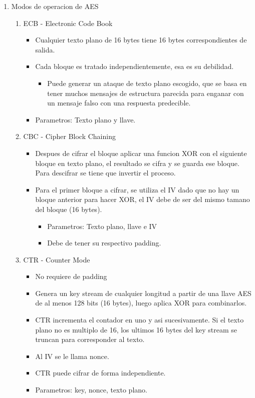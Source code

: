 \documentclass[11pt]{article}
\begin{document}
\begin{enumerate}
\item Modos de operacion de AES
\label{sec:org9fc050c}
\begin{enumerate}
\item ECB - Electronic Code Book
\label{sec:org9f8f37c}
\begin{itemize}
\item Cualquier texto plano de 16 bytes tiene 16 bytes correspondientes de salida.
\item Cada bloque es tratado independientemente, esa es su debilidad.
\begin{itemize}
\item Puede generar un ataque de texto plano escogido, que se basa en tener muchos mensajes de estructura parecida para enganar con un mensaje falso con una respuesta predecible.
\end{itemize}
\item Parametros: Texto plano y llave.
\end{itemize}
\item CBC - Cipher Block Chaining
\label{sec:org26954ef}
\begin{itemize}
\item Despues de cifrar el bloque aplicar una funcion XOR con el siguiente bloque en texto plano, el resultado se cifra y se guarda ese bloque. Para descifrar se tiene que invertir el proceso.
\item Para el primer bloque a cifrar, se utiliza el IV dado que no hay un bloque anterior para hacer XOR, el IV debe de ser del mismo tamano del bloque (16 bytes).
\begin{itemize}
\item Parametros: Texto plano, llave e IV
\item Debe de tener su respectivo padding.
\end{itemize}
\end{itemize}
\item CTR - Counter Mode
\label{sec:org9618abb}
\begin{itemize}
\item No requiere de padding
\item Genera un key stream de cualquier longitud a partir de una llave AES de al menos 128 bits (16 bytes), luego aplica XOR para combinarlos.
\item CTR incrementa el contador en uno y asi sucesivamente. Si el texto plano no es multiplo de 16, los ultimos 16 bytes del key stream se truncan para corresponder al texto.
\item Al IV se le llama nonce.
\item CTR puede cifrar de forma independiente.
\item Parametros: key, nonce, texto plano.
\end{itemize}
\end{enumerate}
\end{enumerate}
\end{document}

